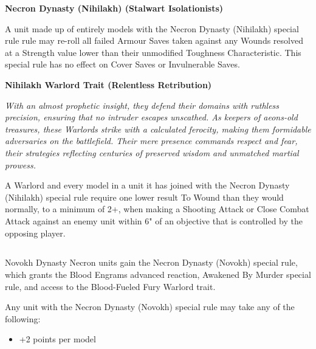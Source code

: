 \begin{multicols}{2}
	\textbf{Necron Dynasty (Nihilakh) (Stalwart Isolationists)}
	
	A unit made up of entirely models with the Necron Dynasty (Nihilakh) special rule rule may re-roll all failed Armour Saves taken against any Wounds resolved at a Strength value lower than their unmodified Toughness Characteristic. This special rule has no effect on Cover Saves or Invulnerable Saves.
	
	\textbf{Nihilakh Warlord Trait (Relentless Retribution)}
	
	\textit{With an almost prophetic insight, they defend their domains with ruthless precision, ensuring that no intruder escapes unscathed. As keepers of aeons-old treasures, these Warlords strike with a calculated ferocity, making them formidable adversaries on the battlefield. Their mere presence commands respect and fear, their strategies reflecting centuries of preserved wisdom and unmatched martial prowess.}
	
	A Warlord and every model in a unit it has joined with the Necron Dynasty (Nihilakh) special rule require one lower result To Wound than they would normally, to a minimum of 2+, when making a Shooting Attack or Close Combat Attack against an enemy unit within 6" of an objective that is controlled by the opposing player.
	
\end{multicols}



\newpage
\subsection[Novokh]{}

Novokh Dynasty Necron units gain the Necron Dynasty (Novokh) special rule, which grants the Blood Engrams advanced reaction, Awakened By Murder special rule, and access to the Blood-Fueled Fury Warlord trait.

Any unit with the Necron Dynasty (Novokh) special rule may take any of the following:
\begin{itemize}
	\item {} \dotfill +2 points per model
\end{itemize}


